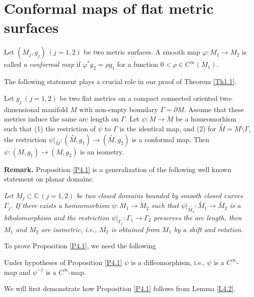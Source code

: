 \documentclass[12pt,reqno]{amsart}
\begin{document}
\section{Conformal maps of flat metric surfaces}

Let $(M_j,g_j)\ (j=1,2)$ be two metric surfaces. A smooth map $\varphi:M_1\to M_2$ is called {\it a conformal map} if $\varphi^*g_2=\rho g_1$ for a function $0<\rho\in C^\infty(M_1)$.

The following statement plays a crucial role in our proof of Theorem \ref{Th1.1}.

\begin{proposition} \label{P4.1}
Let $g_j\ (j=1,2)$ be two flat metrics on a compact connected oriented two-dimensional manifold $M$ with non-empty boundary
$\Gamma=\partial M$. Assume that these metrics induce the same arc length on $\Gamma$. Let $\psi:M\to M$ be a homeomorhism such that (1) the restriction of $\psi$ to $\Gamma$ is the identical map, and (2) for $\stackrel\circ M=M\setminus\Gamma$, the restriction
$\psi|_{\stackrel\circ M}:(\stackrel\circ M,g_1)\to(\stackrel\circ M,g_2)$
is a conformal map. Then $\psi:(M,g_1)\to(M,g_2)$ is an isometry.
\end{proposition}

{\bf Remark.} Proposition \ref{P4.1} is a generalization of the following well known statement on planar domains:

{\it Let $M_j\subset{\mathbb C}\ (j=1,2)$ be two closed domains bounded by smooth closed curves $\Gamma_j$. If there exists a homeomorhism
$\psi:M_1\to M_2$ such that $\psi|_{{\stackrel\circ M_1}}:{\stackrel\circ M}_1\to{\stackrel\circ M}_2$ is a biholomorphism and the restriction
$\psi|_{\Gamma_1}:\Gamma_1\to\Gamma_2$ preserves the arc length, then $M_1$ and $M_2$ are isometric, i.e., $M_2$ is obtained from $M_1$ by a shift and rotation.}

To prove Proposition \ref{P4.1}, we need the following

\begin{lemma} \label{L4.2}
Under hypotheses of Proposition \ref{P4.1} $\psi$ is a diffeomorphism, i.e., $\psi$ is a $C^\infty$-map and $\psi^{-1}$ is a $C^\infty$-map.
\end{lemma}

We will first demonstrate how Proposition \ref{P4.1} follows from Lemma \ref{L4.2}.
\end{document}
